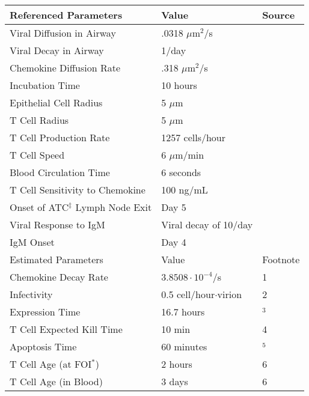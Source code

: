 \documentclass[10pt]{article}
\begin{document}
\begin{table}[!ht]
\begin{center}
\begin{tabular}{| l l l |}
  \hline                        
  Referenced Parameters & Value & Source \\
  \hline
  Viral Diffusion in Airway & .0318 $\mu$m$^2$/s & \cite{Beauchemin2006} \\
  Viral Decay in Airway &  1/day & \cite{Lee2009} \\
  Chemokine Diffusion Rate & .318 $\mu$m$^2$/s & \cite{Beauchemin2006} \\
  Incubation Time &  10 hours & \cite{Mitchell2011} \\
  Epithelial Cell Radius & 5 $\mu$m & \cite{Elbert1999} \\
  T Cell Radius & 5 $\mu$m & \cite{abbas2011cellular} \\
  T Cell Production Rate & 1257 cells/hour & \cite{Miao2010} \\ 
  T Cell Speed & 6 $\mu$m/min & \cite{Egen2011} \\
  Blood Circulation Time & 6 seconds & \cite{Banerjee2010b} \\
  T Cell Sensitivity to Chemokine & 100 ng/mL & \cite{Nandagopal2011} \\
  Onset of ATC$^\ddagger$ Lymph Node Exit & Day 5 & \cite{Banerjee2011} \\
  Viral Response to IgM & Viral decay of 10/day & \cite{Diamond2003} \\
  IgM Onset & Day 4 & \cite{Diamond2003} \\
  \hline
  \hline                        
  Estimated Parameters & Value & Footnote \\
  \hline
  Chemokine Decay Rate & $3.8508\cdot10^{-4}$/s & 1\\
  Infectivity & 0.5 cell/hour$\cdot$virion &  2 \\
  Expression Time & 16.7 hours & \cite{Mitchell2011}$^3$ \\
  T Cell Expected Kill Time & 10 min & 4 \\
  Apoptosis Time & 60 minutes & \cite{Ganusov2008}$^5$ \\
  T Cell Age (at FOI$^\ast$) & 2 hours & 6 \\
  T Cell Age (in Blood) & 3 days & 6 \\
  \hline  
\end{tabular}

\end{center}
\end{table}
\end{document}

